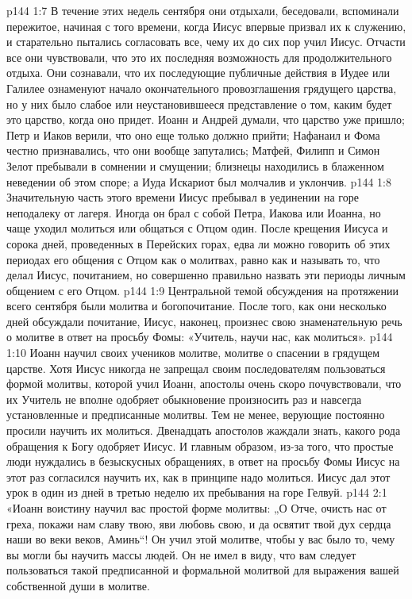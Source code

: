 \vs p144 1:7 В течение этих недель сентября они отдыхали, беседовали, вспоминали пережитое, начиная с того времени, когда Иисус впервые призвал их к служению, и старательно пытались согласовать все, чему их до сих пор учил Иисус. Отчасти все они чувствовали, что это их последняя возможность для продолжительного отдыха. Они сознавали, что их последующие публичные действия в Иудее или Галилее ознаменуют начало окончательного провозглашения грядущего царства, но у них было слабое или неустановившееся представление о том, каким будет это царство, когда оно придет. Иоанн и Андрей думали, что царство уже пришло; Петр и Иаков верили, что оно еще только должно прийти; Нафанаил и Фома честно признавались, что они вообще запутались; Матфей, Филипп и Симон Зелот пребывали в сомнении и смущении; близнецы находились в блаженном неведении об этом споре; а Иуда Искариот был молчалив и уклончив.
\vs p144 1:8 Значительную часть этого времени Иисус пребывал в уединении на горе неподалеку от лагеря. Иногда он брал с собой Петра, Иакова или Иоанна, но чаще уходил молиться или общаться с Отцом один. После крещения Иисуса и сорока дней, проведенных в Перейских горах, едва ли можно говорить об этих периодах его общения с Отцом как о молитвах, равно как и называть то, что делал Иисус, почитанием, но совершенно правильно назвать эти периоды личным общением с его Отцом.
\vs p144 1:9 Центральной темой обсуждения на протяжении всего сентября были молитва и богопочитание. После того, как они несколько дней обсуждали почитание, Иисус, наконец, произнес свою знаменательную речь о молитве в ответ на просьбу Фомы: «Учитель, научи нас, как молиться».
\vs p144 1:10 Иоанн научил своих учеников молитве, молитве о спасении в грядущем царстве. Хотя Иисус никогда не запрещал своим последователям пользоваться формой молитвы, которой учил Иоанн, апостолы очень скоро почувствовали, что их Учитель не вполне одобряет обыкновение произносить раз и навсегда установленные и предписанные молитвы. Тем не менее, верующие постоянно просили научить их молиться. Двенадцать апостолов жаждали знать, какого рода обращения к Богу одобряет Иисус. И главным образом, из\hyp{}за того, что простые люди нуждались в безыскусных обращениях, в ответ на просьбу Фомы Иисус на этот раз согласился научить их, как в принципе надо молиться. Иисус дал этот урок в один из дней в третью неделю их пребывания на горе Гелвуй.
\vs p144 2:1 «Иоанн воистину научил вас простой форме молитвы: „О Отче, очисть нас от греха, покажи нам славу твою, яви любовь свою, и да освятит твой дух сердца наши во веки веков, Аминь“! Он учил этой молитве, чтобы у вас было то, чему вы могли бы научить массы людей. Он не имел в виду, что вам следует пользоваться такой предписанной и формальной молитвой для выражения вашей собственной души в молитве.
